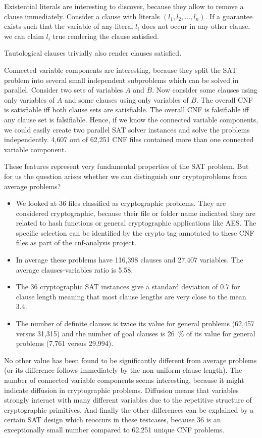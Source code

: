 Existential literals are interesting to discover, because they allow
to remove a clause immediately. Consider a clause with literals
$(l_1, l_2, \ldots, l_n)$. If a guarantee exists such that the variable
of any literal $l_i$ does not occur in any other clause, we can claim
$l_i$ true rendering the clause satisfied.

Tautological clauses trivially also render clauses satisfied.

Connected variable components are interesting, because they split the
SAT problem into several small independent subproblems which can be 
solved in parallel.
Consider two sets of variables $A$ and $B$. Now consider some clauses
using only variables of $A$ and some clauses using only variables of $B$.
The overall CNF is satisfiable iff both clause sets are satisfiable.
The overall CNF is falsifiable iff any clause set is falsifiable.
Hence, if we know the connected variable components, we could easily
create two parallel SAT solver instances and solve the problems
independently. 4,607 out of 62,251 CNF files contained more than one
connected variable component.

These features represent very fundamental properties of the SAT problem.
But for us the question arises whether we can distinguish our cryptoproblems
from average problems?

\begin{itemize}
\item We looked at 36 files classified as cryptographic problems.
  They are considered cryptographic, because their file or folder name
  indicated they are related to hash functions or general cryptographic
  applications like AES. The specific selection can be identified by
  the crypto tag annotated to these CNF files as part of the cnf-analysis
  project.
\item In average these problems have 116,398 clauses and 27,407 variables.
  The average clauses-variables ratio is 5.58.
\item The 36 cryptographic SAT instances give a standard deviation of 0.7
  for clause length meaning that most clause lengths are very close to
  the mean 3.4.
\item The number of definite clauses is twice its value for general problems
  (62,457 versus 31,315) and the number of goal clauses is 26~\% of its
  value for general problems (7,761 versus 29,994).
\end{itemize}

No other value has been found to be significantly different from
average problems (or its difference follows immediately by the
non-uniform clause length). The number of connected variable
components seems interesting, because it might indicate diffusion
in cryptographic problems. Diffusion means that variables strongly
interact with many different variables due to the repetitive
structure of cryptographic primitives. And finally the other
differences can be explained by a certain SAT design which
reoccurs in these testcases, because 36 is an exceptionally small
number compared to 62,251 unique CNF problems.

